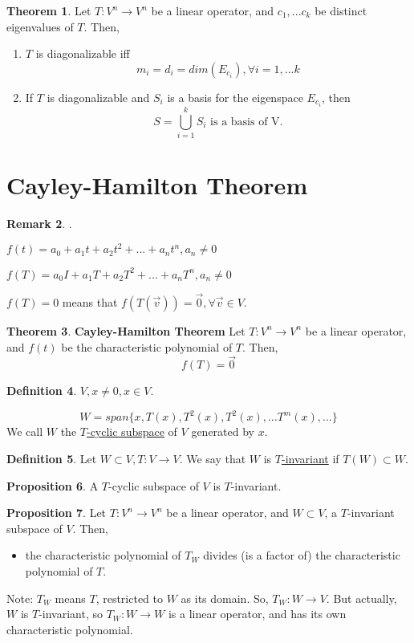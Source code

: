 \documentclass[a5paper]{article}
\theoremstyle{definition}%
\newtheorem{theorem}{Theorem}
\numberwithin{theorem}{section} %
\newtheorem{definition}[theorem]{Definition}
\newtheorem{proposition}[theorem]{Proposition}
\newtheorem{remark}[theorem]{Remark}
\begin{document}
\begin{theorem}
Let $T:V^n \to V^n$ be a linear operator, and  $c_1, ... c_{k}$ be distinct eigenvalues of $T$. Then,
\begin{enumerate}
\item $T$ is diagonalizable iff 
$$m_i = d_i = dim(E_{c_i}), \forall i = 1, ...k$$
\item If $T$ is diagonalizable and $S_i$ is a basis for the eigenspace $E_{c_i}$, then 
$$S = \bigcup_{i=1}^kS_i \text{ is a basis of V.}$$
\end{enumerate}
\end{theorem}

\section{Cayley-Hamilton Theorem}

\begin{remark}.

$f(t) = a_0 + a_1t + a_2t^2 + ... + a_nt^n, a_n \neq 0$

$f(T) = a_0I + a_1T + a_2T^2 + ... + a_nT^n, a_n \neq 0$

$f(T) = 0$ means that $f(T(\vec{v})) = \vec{0}, \forall \vec{v} \in V.$
\end{remark}

\begin{theorem}
\textbf{Cayley-Hamilton Theorem}
Let $T:V^n \to V^n$ be a linear operator, and $f(t)$ be the characteristic polynomial of $T$. Then, 
$$f(T) = \vec{0}$$
\end{theorem}

\begin{definition}
$V, x \neq 0, x \in V$.

$$W = span\{x, T(x), T^2(x), T^2(x), ... T^m(x), ...\} $$
We call $W$ the \underline{$T$-cyclic subspace} of $V$ generated by $x$. 
\end{definition}

\begin{definition}
Let $W \subset V, T:V \to V.$ We say that $W$ is \underline{$T$-invariant} if $T(W) \subset W$. 
\end{definition}

\begin{proposition}
A $T$-cyclic subspace of $V$ is $T$-invariant.
\end{proposition}

\begin{proposition}
Let $T:V^n \to V^n$ be a linear operator, and $W \subset V$, a $T$-invariant subspace of $V$. Then, 
\begin{itemize}
\item the characteristic polynomial of $T_W$ divides (is a factor of) the characteristic polynomial of $T$. 
\end{itemize}
Note: $T_W$ means $T$, restricted to $W$ as its domain. So, $T_W: W \to V$. But actually, $W$ is $T$-invariant, so $T_W:W \to W$ is a linear operator, and has its own characteristic polynomial. 
\end{proposition}
\end{document}
